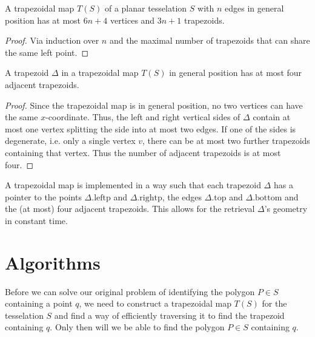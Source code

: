         \begin{lemma}
            A trapezoidal map $T(S)$ of a planar tesselation $S$ with $n$ edges in general position has at most $6n + 4$ vertices and $3n + 1$ trapezoids. 
        \end{lemma}
        \begin{proof}
            Via induction over $n$ and the maximal number of trapezoids that can share the same left point. 
        \end{proof}

        \begin{lemma}
            A trapezoid $\Delta$ in a trapezoidal map $T(S)$ in general position has at most four adjacent trapezoids.
        \end{lemma}
        \begin{proof}
            Since the trapezoidal map is in general position, no two vertices can have the same $x$-coordinate. Thus, the left and right vertical sides of $\Delta$ contain at most one vertex splitting the side into at most two edges. If one of the sides is degenerate, i.e. only a single vertex $v$, there can be at most two further trapezoids containing that vertex. Thus the number of adjacent trapezoids is at most four. 
        \end{proof}

        \begin{remark}
            A trapezoidal map is implemented in a way such that each trapezoid $\Delta$ has a pointer to the points $\Delta.\text{leftp}$ and $\Delta.\text{rightp}$, the edges $\Delta.\text{top}$ and $\Delta.\text{bottom}$ and the (at most) four adjacent trapezoids. This allows for the retrieval $\Delta$'s geometry in constant time.
        \end{remark}
        

\section{Algorithms}
    Before we can solve our original problem of identifying the polygon $P \in S$ containing a point $q$, we need to construct a trapezoidal map $T(S)$ for the tesselation $S$ and find a way of efficiently traversing it to find the trapezoid containing $q$. Only then will we be able to find the polygon $P \in S$ containing $q$. 

